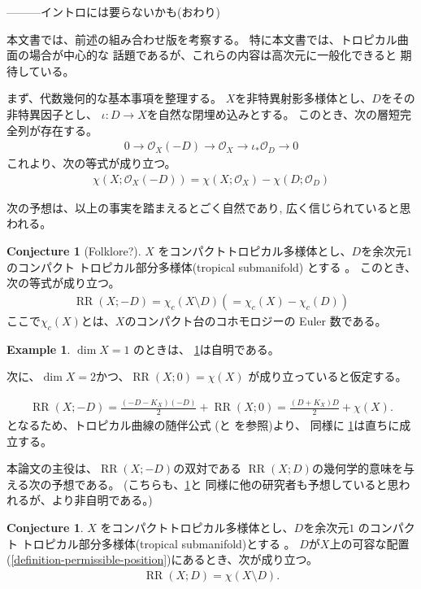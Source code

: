 \documentclass[a4paper,dvipdfmx,reqno,12pt]{amsart}
\theoremstyle{definition}
\newtheorem{example}[theorem]{Example}
\newtheorem{conjecture}[theorem]{Conjecture}
\newcommand{\opn}[1]{\operatorname{#1}}
\numberwithin{equation}{section}
\begin{document}
---------イントロには要らないかも(おわり)

本文書では、前述の組み合わせ版を考察する。
特に本文書では、トロピカル曲面の場合が中心的な
話題であるが、これらの内容は高次元に一般化できると
期待している。

まず、代数幾何的な基本事項を整理する。
$X$を非特異射影多様体とし、$D$をその非特異因子とし、
$\iota\colon D\to X$を自然な閉埋め込みとする。
このとき、次の層短完全列が存在する。
\begin{align}
     0\to \mathcal{O}_X(-D)\to 
\mathcal{O}_X\to \iota_*\mathcal{O}_D\to 0
\end{align}
これより、次の等式が成り立つ。
\begin{align}
\chi(X;\mathcal{O}_X(-D))=\chi(X;\mathcal{O}_X)
-\chi(D;\mathcal{O}_D)
\end{align}

次の予想は、以上の事実を踏まえるとごく自然であり,
広く信じられていると思われる。

\begin{conjecture}[{Folklore?}]
\label{conjecture-rr-c-euler}
$X$ をコンパクトトロピカル多様体とし、$D$を余次元$1$
のコンパクト
トロピカル部分多様体(tropical submanifold)
とする
\cite[Definition 2.14]{demedrano2023chern}。
このとき、次の等式が成り立つ。
\begin{align}
\opn{RR}(X;-D)=
\chi_c (X\setminus D) (=\chi_c (X)-\chi_c(D))
\end{align}
ここで$\chi_c(X)$とは、$X$のコンパクト台のコホモロジーの
Euler 数である。

\end{conjecture}

\begin{example}
$\dim X=1$ のときは、
\cref{conjecture-rr-c-euler}は自明である。

次に、$\dim X=2$かつ、$\opn{RR}(X;0)=\chi(X)$
が成り立っていると仮定する。

\begin{align}
\opn{RR}(X;-D)=\frac{(-D-K_X)(-D)}{2}+\opn{RR}(X;0)
=\frac{(D+K_X)D}{2}+\chi(X).
\end{align}
となるため、トロピカル曲線の随伴公式
(\cite[Theorem 6]{shaw2015tropical}と
\cite[Theorem 5.2]{demedrano2023chern}を参照)より、
同様に \cref{conjecture-rr-c-euler}は直ちに成立する。
\end{example}
本論文の主役は、$\opn{RR}(X;-D)$の双対である
$\opn{RR}(X;D)$の幾何学的意味を与える次の予想である。
(こちらも、\cref{conjecture-rr-c-euler}と
同様に他の研究者も予想していると思われるが、より非自明である。)
\begin{conjecture}
\label{conjecture-rr-euler}
$X$ をコンパクトトロピカル多様体とし、$D$を余次元$1$
のコンパクト
トロピカル部分多様体(tropical submanifold)とする
\cite[Definition 2.14]{demedrano2023chern}。
$D$が$X$上の可容な配置
(\cref{definition-permissible-position})にあるとき、次が成り立つ。
\begin{align}
\opn{RR}(X;D)=\chi(X\setminus D).
\end{align}
\end{conjecture}
\end{document}
